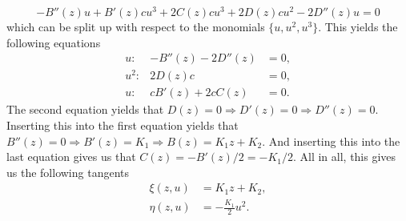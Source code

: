 $$- B''(z) u +B'(z) c u^{3} + 2 C(z) c u^{3} + 2 D(z) c u^{2} - 2 D''(z) u=0$$
which can be split up with respect to the monomials $\{u,u^2,u^3\}$. This yields the following equations
\begin{align*}
  u:&-B''(z)-2D''(z)&=0,\\
  u^2:&2D(z)c&=0,\\
  u:&cB'(z)+2cC(z)&=0.
\end{align*}
The second equation yields that $D(z)=0\Longrightarrow D'(z)=0\Longrightarrow D''(z)=0$. Inserting this into the first equation yields that $B''(z)=0\Longrightarrow B'(z)=K_1\Longrightarrow B(z)=K_{1}z+K_{2}$. And inserting this into the last equation gives us that $C(z)=-B'(z)/2=-K_1/2$. All in all, this gives us the following tangents
\begin{align}
  \xi{(z,u)}&=K_{1}z+K_{2},\\
  \eta{(z,u)}&=-\frac{K_{1}}{2}u^{2}.
\end{align}
